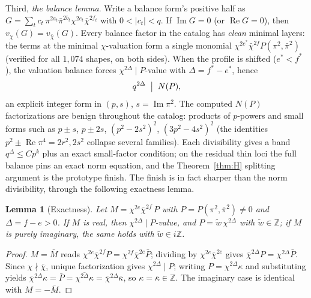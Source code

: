 \documentclass[11pt]{article}
\newtheorem{lemma}[theorem]{Lemma}
\theoremstyle{remark}
\newcommand{\Z}{\mathbb{Z}}
\DeclareMathOperator{\im}{Im}
\DeclareMathOperator{\re}{Re}
\begin{document}
Third, \emph{the balance lemma}.  Write a balance form's positive half as
$G=\sum_t c_t\,\pi^{2a_t}\bar\pi^{2b_t}\chi^{2e_t}\bar\chi^{2f_t}$ with
$0<|c_t|<q$.  If $\im G=0$ (or $\re G=0$), then $v_\chi(G)=v_{\bar\chi}(G)$.
Every balance factor in the catalog has \emph{clean} minimal layers: the
terms at the minimal $\chi$-valuation form a single monomial
$\chi^{2e^*}\bar\chi^{2f}P(\pi^2,\bar\pi^2)$ (verified for all $1{,}074$
shapes, on both sides).  When the profile is shifted ($e^*<f^*$), the
valuation balance forces $\chi^{2\Delta}\mid P$-value with
$\Delta=f^*-e^*$, hence
\[
  q^{2\Delta}\;\bigm|\;N(P),
\]
an explicit integer form in $(p,s)$, $s=\im\pi^2$.  The computed $N(P)$
factorizations are benign throughout the catalog: products of $p$-powers and
small forms such as $p\pm s$, $p\pm 2s$, $(p^2-2s^2)^2$, $(3p^2-4s^2)^2$
(the identities $p^2\pm\re\pi^4=2r^2,2s^2$ collapse several families).  Each
divisibility gives a band $q^\Delta\le C p^k$ plus an exact small-factor
condition; on the residual thin loci the full balance pins an exact norm
equation, and the Theorem~\ref{thm:H} splitting argument is the prototype
finish.  The finish is in fact sharper than the norm divisibility, through the
following exactness lemma.

\begin{lemma}[Exactness]\label{lem:exact}
Let $M=\chi^{2e}\bar\chi^{2f}\,P$ with $P=P(\pi^2,\bar\pi^2)\neq0$ and
$\Delta=f-e>0$.  If $M$ is real, then $\chi^{2\Delta}\mid P$-value, and
$P=\tilde w\,\chi^{2\Delta}$ with $\tilde w\in\Z$; if $M$ is purely
imaginary, the same holds with $\tilde w\in i\Z$.
\end{lemma}

\begin{proof}
$M=\bar M$ reads $\chi^{2e}\bar\chi^{2f}P=\chi^{2f}\bar\chi^{2e}\bar P$;
dividing by $\chi^{2e}\bar\chi^{2e}$ gives $\bar\chi^{2\Delta}P=
\chi^{2\Delta}\bar P$.  Since $\chi\nmid\bar\chi$, unique factorization
gives $\chi^{2\Delta}\mid P$; writing $P=\chi^{2\Delta}\kappa$ and
substituting yields $\bar\chi^{2\Delta}\kappa=\bar P=\overline{\chi^{2\Delta}\kappa}
=\bar\chi^{2\Delta}\bar\kappa$, so $\kappa=\bar\kappa\in\Z$.  The
imaginary case is identical with $M=-\bar M$.
\end{proof}
\end{document}
